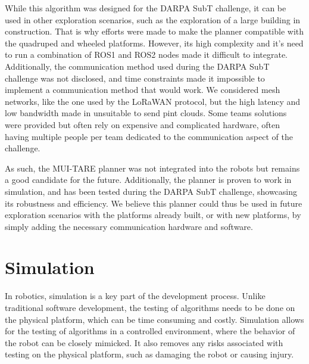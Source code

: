 \documentclass[12pt]{article}
\begin{document}
        While this algorithm was designed for the DARPA SubT challenge, it can be used in other exploration scenarios, such as the exploration of a large building in construction. That is why efforts were made to make the planner compatible with the quadruped and wheeled platforms. However, its high complexity and it's need to run a combination of ROS1 and ROS2 nodes made it difficult to integrate. Additionally, the communication method used during the DARPA SubT challenge was not disclosed, and time constraints made it impossible to implement a communication method that would work. We considered mesh networks, like the one used by the LoRaWAN \cite{rahman2020lorawan} protocol, but the high latency and low bandwidth made in unsuitable to send pint clouds. Some teams solutions were provided \cite{roucek2021system} but often rely on expensive and complicated hardware, often having multiple people per team dedicated to the communication aspect of the challenge.

        As such, the MUI-TARE planner was not integrated into the robots but remains a good candidate for the future. Additionally, the planner is proven to work in simulation, and has been tested during the DARPA SubT challenge, showcasing its robustness and efficiency. We believe this planner could thus be used in future exploration scenarios with the platforms already built, or with new platforms, by simply adding the necessary communication hardware and software. 



    
\newpage
\section{Simulation}

    In robotics, simulation is a key part of the development process. Unlike traditional software development, the testing of algorithms needs to be done on the physical platform, which can be time consuming and costly. Simulation allows for the testing of algorithms in a controlled environment, where the behavior of the robot can be closely mimicked. It also removes any risks associated with testing on the physical platform, such as damaging the robot or causing injury. 
\end{document}
